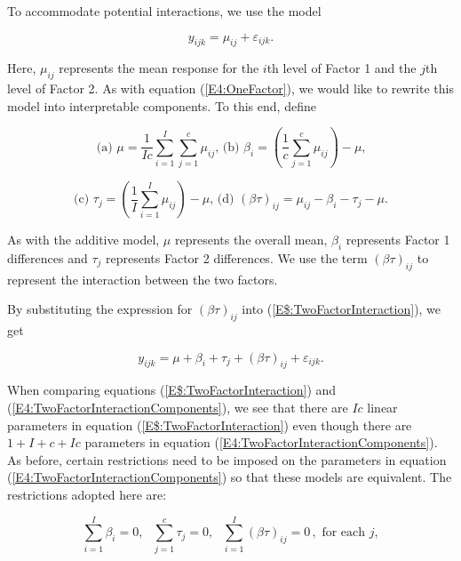 To accommodate potential interactions, we use the model

\begin{equation}\label{E$:TwoFactorInteraction}
y_{ijk}=\mu _{ij}+\varepsilon_{ijk}.
\end{equation}

\noindent Here, $\mu_{ij}$ represents the mean response for the
$i$th level of Factor 1 and the $j$th level of Factor 2. As with
equation (\ref{E4:OneFactor}), we would like to rewrite this model
into interpretable components. To this end, define

\begin{equation*}
\text{(a) }\mu =\frac{1}{Ic}\sum_{i=1}^{I}\sum_{j=1}^{c}\mu
_{ij}\text{, \ \ (b) }\beta _{i}=(\frac{1}{c}\sum_{j=1}^{c}\mu
_{ij})-\mu \text{,}
\end{equation*}

\begin{equation*}
\text{(c) }\tau _{j}=(\frac{1}{I}\sum_{i=1}^{I}\mu _{ij})-\mu
\text{,\ \ \ (d) }(\beta \tau )_{ij}=\mu _{ij}-\beta _{i}-\tau
_{j}-\mu .
\end{equation*}

\noindent As with the additive model, $\mu $ represents the overall
mean, $\beta _{i}$ represents Factor 1 differences and $\tau _{j}$
represents Factor 2 differences. We use the term $(\beta \tau
)_{ij}$ to represent the interaction between the two factors.

By substituting the expression for $(\beta \tau )_{ij}$ into
(\ref{E$:TwoFactorInteraction}), we get

\begin{equation} \label{E4:TwoFactorInteractionComponents}
y_{ijk}=\mu +\beta _{i}+\tau _{j}+(\beta \tau
)_{ij}+\varepsilon_{ijk}.
\end{equation}%
\qquad

When comparing equations (\ref{E$:TwoFactorInteraction}) and
(\ref{E4:TwoFactorInteractionComponents}), we see that there are
$Ic$ linear parameters in equation (\ref{E$:TwoFactorInteraction})
even though there are $1+I+c+Ic$ parameters in equation
(\ref{E4:TwoFactorInteractionComponents}). As before, certain
restrictions need to be imposed on the parameters in equation
(\ref{E4:TwoFactorInteractionComponents}) so that these models are
equivalent. The restrictions adopted here are:

\begin{equation*}
\sum_{i=1}^{I}\beta _{i}=0,\text{ }\sum_{j=1}^{c}\tau _{j}=0,\text{ }%
\sum_{i=1}^{I}(\beta \tau )_{ij}=0\,,\text{ \ for each }j,
\end{equation*}

